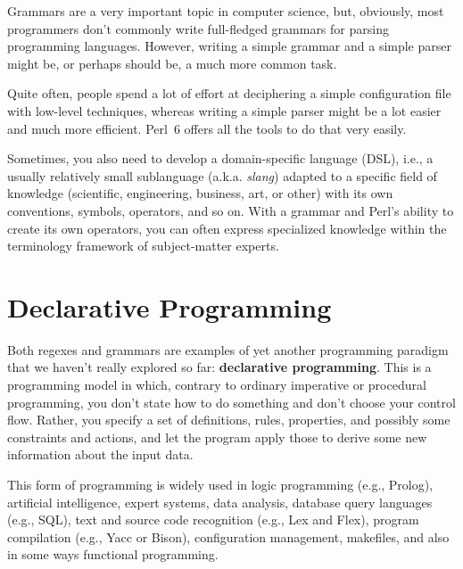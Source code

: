 Grammars are a very important topic in computer science, 
but, obviously, most programmers don't commonly write 
full-fledged grammars for parsing programming languages. 
However, writing a simple grammar and a simple parser 
might be, or perhaps should be, a much more common task. 

Quite often, people spend a lot of effort at deciphering a 
simple configuration file with low-level techniques, whereas 
writing a simple parser might be a lot easier and much more 
efficient. Perl~6 offers all the tools to do that 
very easily.


Sometimes, you also need to develop a domain-specific 
language (DSL), i.e., a usually relatively small sublanguage 
(a.k.a. \emph{slang}) adapted to a specific field of 
knowledge (scientific, engineering, business, art, or other) 
with its own conventions, symbols, operators, and so on. 
With a grammar and Perl's ability to create its own operators, 
you can often express specialized knowledge within the 
terminology framework of subject-matter experts.

\section{Declarative Programming}

Both regexes and grammars are examples of yet another programming 
paradigm that we haven't really explored so far: {\bf declarative 
programming}. This is a programming model in which, contrary 
to ordinary imperative or procedural programming, you don't 
state how to do something and don't choose your control flow. 
Rather, you specify a set of definitions, rules, properties, 
and possibly some constraints and actions, and let the program 
apply those to derive some new information about the input 
data. 


This form of programming is widely used in logic programming 
(e.g., Prolog), artificial intelligence, expert systems, 
data analysis, database query languages (e.g., SQL), text and 
source code recognition (e.g., Lex and Flex), program 
compilation (e.g., Yacc or Bison), configuration management, 
makefiles, and also in some ways functional programming.



